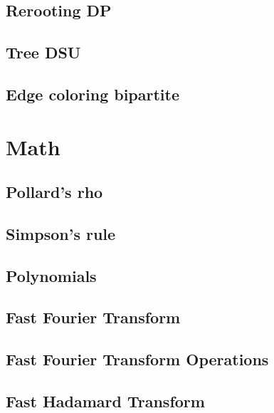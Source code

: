 \begin{multicols}{2}
\subsection{Rerooting DP}

\subsection{Tree DSU}

\subsection{Edge coloring bipartite}

\section{Math}


\subsection{Pollard's rho}

\subsection{Simpson's rule}

\subsection{Polynomials}

\subsection{Fast Fourier Transform}

\subsection{Fast Fourier Transform Operations}

\subsection{Fast Hadamard Transform}


\end{multicols}
